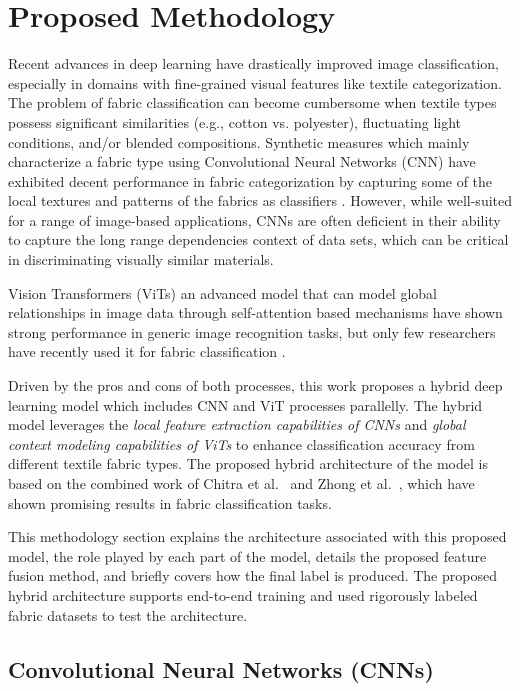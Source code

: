 \section{Proposed Methodology}

Recent advances in deep learning have drastically improved image classification, especially in domains with fine-grained visual features like textile categorization. The problem of fabric classification can become cumbersome when textile types possess significant similarities (e.g., cotton vs. polyester), fluctuating light conditions, and/or blended compositions. Synthetic measures which mainly characterize a fabric type using Convolutional Neural Networks (CNN) have exhibited decent performance in fabric categorization by capturing some of the local textures and patterns of the fabrics as classifiers \cite{hong2024research, kampouris2016fine}. However, while well-suited for a range of image-based applications, CNNs are often deficient in their ability to capture the long range dependencies context of data sets, which can be critical in discriminating visually similar materials. 

Vision Transformers (ViTs) an advanced model that can model global relationships in image data through self-attention based mechanisms \cite{dosovitskiy2020vit} have shown strong performance in generic image recognition tasks, but only few researchers have recently used it for fabric classification \cite{chitra2023fabric}. 

Driven by the pros and cons of both processes, this work proposes a hybrid deep learning model which includes CNN and ViT processes parallelly. The hybrid model leverages the \textit{local feature extraction capabilities of CNNs} and \textit{global context modeling capabilities of ViTs} to enhance classification accuracy from different textile fabric types. The proposed hybrid architecture of the model is based on the combined work of Chitra et al.~\cite{chitra2023fabric} and Zhong et al.~\cite{hong2024research}, which have shown promising results in fabric classification tasks.

This methodology section explains the architecture associated with this proposed model, the role played by each part of the model, details the proposed feature fusion method, and briefly covers how the final label is produced. The proposed hybrid architecture supports end-to-end training and used rigorously labeled fabric datasets to test the architecture.

\subsection{Convolutional Neural Networks (CNNs)}

